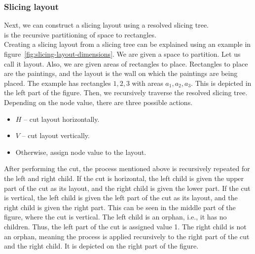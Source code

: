 
\subsubsection*{Slicing layout}

Next, we can construct a slicing layout using a resolved slicing tree.\\

 is the recursive partitioning of space to rectangles.\\

Creating a slicing layout from a slicing tree can be explained using an
example in figure~\ref{fig:slicing-layout-dimensions}.
We are given a space to partition. Let us call it layout. Also, we are given areas of rectangles to place.
Rectangles to place are the paintings, and the layout is the wall on which the paintings are being placed.
The example has rectangles $1,2,3$ with areas $a_1, a_2, a_3$.
This is depicted in the left part of the figure.
Then, we recursively traverse the resolved slicing tree.
Depending on the node value, there are three possible actions.

\begin{itemize}
    \item $H$ – cut layout horizontally.
    \item $V$ – cut layout vertically.
    \item Otherwise, assign node value to the layout.
\end{itemize}

After performing the cut, the process mentioned above is recursively repeated
for the left and right child.
If the cut is horizontal, the left child is given the upper part of the cut as its layout, and the right child is given the lower part.
If the cut is vertical, the left child is given the left part of the cut as its layout, and the right child is given the right part.
This can be seen in the middle part of the figure, where the cut is vertical.
The left child is an orphan, i.e., it has no children.
Thus, the left part of the cut is assigned value 1.
The right child is not an orphan, meaning the process is applied recursively to the right part of the cut and the right child.
It is depicted on the right part of the figure.

